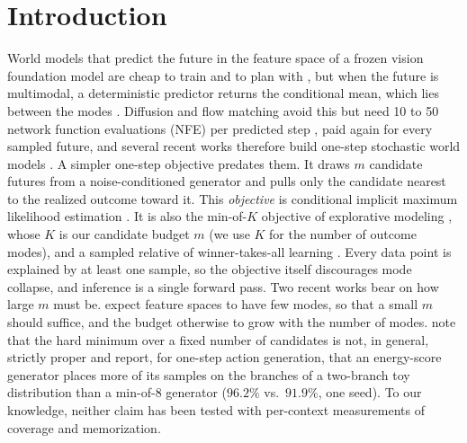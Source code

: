 \section{Introduction}
\label{sec:intro}

World models that predict the future in the feature space of a frozen vision foundation model are cheap to train and to plan with \citep{zhou2025dinowm,baldassarre2025dinoworld,assran2025vjepa2}, but when the future is multimodal, a deterministic predictor returns the conditional mean, which lies between the modes \citep{porcher2026flowwm}.{\renewcommand{\thefootnote}{}} Diffusion and flow matching avoid this but need 10 to 50 network function evaluations (NFE) per predicted step \citep{porcher2026flowwm,boduljak2025vfmf}, paid again for every sampled future, and several recent works therefore build one-step stochastic world models \citep{lu2026driftworld,agibot2026geact,lee2026beckmann,park2026priming,hsu2026vsf}. A simpler one-step objective predates them. It draws $m$ candidate futures from a noise-conditioned generator and pulls only the candidate nearest to the realized outcome toward it. This \emph{\nom{} objective} is conditional implicit maximum likelihood estimation \citep[IMLE;][]{li2018imle,li2019diverse}. It is also the min-of-$K$ objective of explorative modeling \citep{gladstone2026xm}, whose $K$ is our candidate budget $m$ (we use $K$ for the number of outcome modes), and a sampled relative of winner-takes-all learning \citep{guzman2012mcl,rupprecht2017mhp}. Every data point is explained by at least one sample, so the objective itself discourages mode collapse, and inference is a single forward pass. Two recent works bear on how large $m$ must be. \citet{gladstone2026xm} expect feature spaces to have few modes, so that a small $m$ should suffice, and the budget otherwise to grow with the number of modes. \citet{makabe2026esp} note that the hard minimum over a fixed number of candidates is not, in general, strictly proper and report, for one-step action generation, that an energy-score generator places more of its samples on the branches of a two-branch toy distribution than a min-of-8 generator ($96.2\%$ vs.\ $91.9\%$, one seed). To our knowledge, neither claim has been tested with per-context measurements of coverage and memorization.

